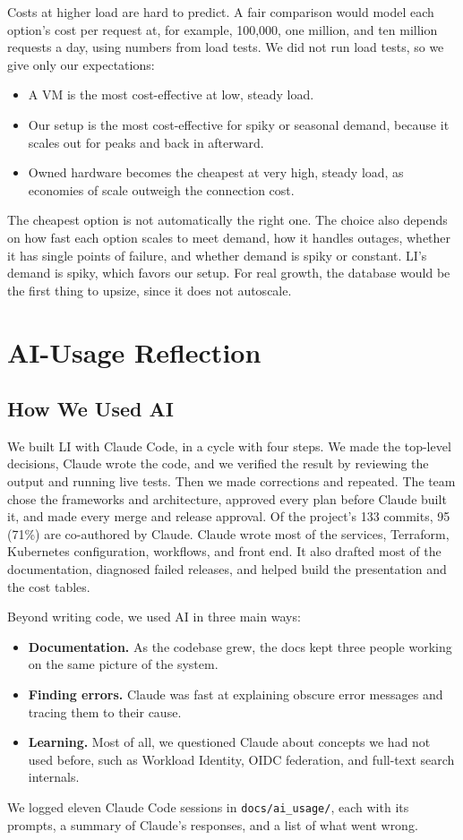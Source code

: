 \documentclass[conference]{IEEEtran}
\begin{document}
Costs at higher load are hard to predict. A fair comparison would model
each option's cost per request at, for example, 100,000, one million, and
ten million requests a day, using numbers from load tests. We did not run
load tests, so we give only our expectations:
\begin{itemize}
\item A VM is the most cost-effective at low, steady load.
\item Our setup is the most cost-effective for spiky or seasonal demand,
because it scales out for peaks and back in afterward.
\item Owned hardware becomes the cheapest at very high, steady load, as
economies of scale outweigh the connection cost.
\end{itemize}
The cheapest option is not automatically the right one. The choice also
depends on how fast each option scales to meet demand, how it handles
outages, whether it has single points of failure, and whether demand is
spiky or constant. LI's demand is spiky, which favors our setup. For real
growth, the database would be the first thing to upsize, since it does not
autoscale.

\section{AI-Usage Reflection}
\label{sec:ai}

\subsection{How We Used AI}
We built LI with Claude Code, in a cycle with four steps. We made the
top-level decisions, Claude wrote the code, and we verified the result by
reviewing the output and running live tests. Then we made corrections and
repeated. The team chose the frameworks and architecture, approved every
plan before Claude built it, and made every merge and release approval.
Of the project's 133 commits, 95 (71\%) are co-authored by Claude. Claude
wrote most of the services, Terraform, Kubernetes configuration,
workflows, and front end. It also drafted most of the documentation,
diagnosed failed releases, and helped build the presentation and the cost
tables.

Beyond writing code, we used AI in three main ways:
\begin{itemize}
\item \textbf{Documentation.} As the codebase grew, the docs kept three
people working on the same picture of the system.
\item \textbf{Finding errors.} Claude was fast at explaining obscure error
messages and tracing them to their cause.
\item \textbf{Learning.} Most of all, we questioned Claude about concepts
we had not used before, such as Workload Identity, OIDC federation, and
full-text search internals.
\end{itemize}
We logged eleven Claude Code sessions in \texttt{docs/ai\_usage/}, each
with its prompts, a summary of Claude's responses, and a list of what went
wrong.
\end{document}
